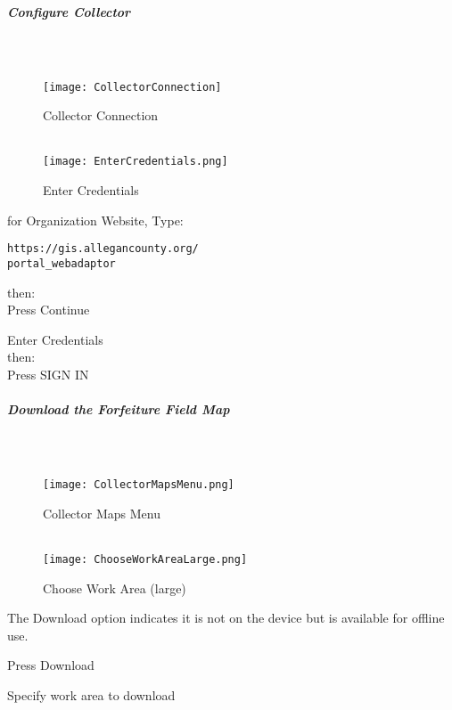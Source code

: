 \documentclass[class=article , crop=false, titlepage, twoside, multi={itemize, figure, verbatim}, float=false]{standalone}
\begin{document}
\clearpage
\subparagraph{Configure Collector}

\subparagraph*{\\}
\begin{wrapfigure}{r}{0.5\textwidth}
\centering
\texttt{[image: CollectorConnection]}
\caption{Collector Connection}
\vspace{.25in}
\HRule \\[.4cm] %
\vspace{.25in}
\texttt{[image: EnterCredentials.png]}
\caption{Enter Credentials}
\end{wrapfigure}
for Organization Website, Type:
\vspace{.5in}

\begin{verbatim}
https://gis.allegancounty.org/
portal_webadaptor

\end{verbatim}

then:\\

Press Continue

\vspace{3in}
Enter Credentials\\

then:\\

Press SIGN IN
\clearpage
\subparagraph{Download the Forfeiture Field Map}

\subparagraph*{\\}
\begin{wrapfigure}{r}{0.5\textwidth}
\centering
\texttt{[image: CollectorMapsMenu.png]}
\caption{Collector Maps Menu}
\vspace{.25in}
\HRule \\[.4cm] %
\vspace{.25in}
\texttt{[image: ChooseWorkAreaLarge.png]}
\caption{Choose Work Area (large)}
\end{wrapfigure}
The Download option indicates it is not on the device but is available for offline use.
\vspace{.5in}

\noindent Press Download\\
\vspace{3in}

\noindent Specify work area to download\\
\vspace{1in}
\end{document}
